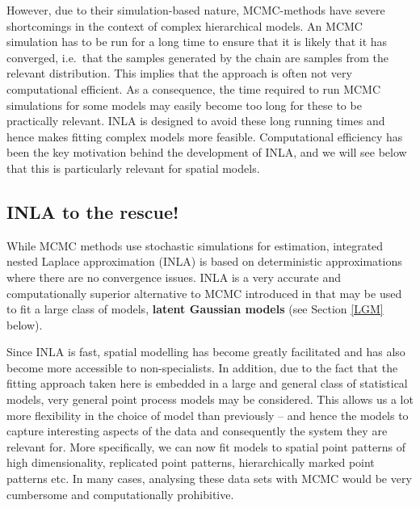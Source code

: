 However, due to their  simulation-based nature, MCMC-methods have severe shortcomings in the context of complex hierarchical models. An MCMC simulation has to be run for a long time to ensure that it is likely that it has converged, i.e.\ that the samples generated by the chain are samples from the relevant distribution. This implies that the approach is often not very computational efficient. As a consequence,  the time required to run MCMC simulations for some models may easily become too long for these to be practically relevant.  INLA is designed to avoid these long running times and hence makes fitting complex models more feasible. Computational efficiency has been the key motivation behind the development of INLA, and we will see below that this is particularly relevant for spatial models.

 \subsection{INLA to the rescue!}
While MCMC methods use stochastic simulations for estimation, integrated nested Laplace approximation (INLA)  is based on deterministic approximations where there are no convergence issues. INLA is a very accurate and computationally superior alternative to MCMC introduced in \cite{rueal:09} that may be used to fit a large class of models, \textbf{latent Gaussian models} (see Section \ref{LGM} below). 

Since INLA is fast, spatial modelling has become greatly facilitated and has also become more accessible to non-specialists. In addition, due to the fact that the fitting approach taken here is embedded in a large and general class of statistical models,  very general point process models may be considered. This allows us a lot more flexibility in the choice of model than previously -- and hence the models to capture interesting aspects of the data and consequently the system they are relevant for. More specifically, we can now fit models to spatial point patterns of high dimensionality, replicated point patterns, hierarchically marked point patterns etc.  In many cases, analysing these data sets with MCMC  would be very cumbersome and computationally prohibitive.

